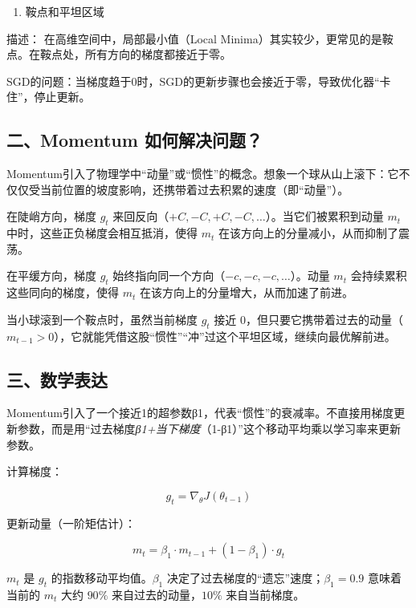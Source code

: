 \begin{enumerate}
\def\labelenumi{\arabic{enumi}.}
\setcounter{enumi}{1}
\tightlist
\item
  鞍点和平坦区域
\end{enumerate}

描述： 在高维空间中，局部最小值（Local Minima）其实较少，更常见的是鞍点。在鞍点处，所有方向的梯度都接近于零。

SGD的问题：当梯度趋于0时，SGD的更新步骤也会接近于零，导致优化器``卡住''，停止更新。

\hypertarget{ux4e8cmomentum-ux5982ux4f55ux89e3ux51b3ux95eeux9898}{%
\subsection{二、Momentum 如何解决问题？}\label{ux4e8cmomentum-ux5982ux4f55ux89e3ux51b3ux95eeux9898}}

Momentum引入了物理学中``动量''或``惯性''的概念。想象一个球从山上滚下：它不仅仅受当前位置的坡度影响，还携带着过去积累的速度（即``动量''）。

在陡峭方向，梯度 \(g_t\) 来回反向（\(+C, -C, +C, -C, \ldots\)）。当它们被累积到动量 \(m_t\) 中时，这些正负梯度会相互抵消，使得 \(m_t\) 在该方向上的分量减小，从而抑制了震荡。

在平缓方向，梯度 \(g_t\) 始终指向同一个方向（\(-c, -c, -c, \ldots\)）。动量 \(m_t\) 会持续累积这些同向的梯度，使得 \(m_t\) 在该方向上的分量增大，从而加速了前进。

当小球滚到一个鞍点时，虽然当前梯度 \(g_t\) 接近 \(0\)，但只要它携带着过去的动量（\(m_{t-1}>0\)），它就能凭借这股``惯性''``冲''过这个平坦区域，继续向最优解前进。

\hypertarget{ux4e09ux6570ux5b66ux8868ux8fbe}{%
\subsection{三、数学表达}\label{ux4e09ux6570ux5b66ux8868ux8fbe}}

Momentum引入了一个接近1的超参数β1，代表``惯性''的衰减率。不直接用梯度更新参数，而是用``过去梯度\emph{β1+当下梯度}（1-β1）''这个移动平均乘以学习率来更新参数。

计算梯度：

\[
g_t = \nabla_\theta J(\theta_{t-1})
\]

更新动量（一阶矩估计）：

\[
m_t = \beta_1 \cdot m_{t-1} + (1-\beta_1)\cdot g_t
\]

\(m_t\) 是 \(g_t\) 的指数移动平均值。\(\beta_1\) 决定了过去梯度的``遗忘''速度；\(\beta_1=0.9\) 意味着当前的 \(m_t\) 大约 \(90\%\) 来自过去的动量，\(10\%\) 来自当前梯度。

